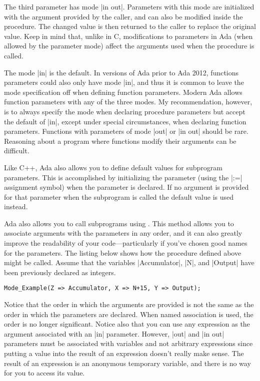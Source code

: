 The third parameter has mode |in out|. Parameters with this mode are initialized with the
argument provided by the caller, and can also be modified inside the procedure. The changed
value is then returned to the caller to replace the original value. Keep in mind that, unlike in
C, modifications to parameters in Ada (when allowed by the parameter mode) affect the arguments
used when the procedure is called.

The mode |in| is the default. In versions of Ada prior to Ada 2012, functions parameters could
also only have mode |in|, and thus it is common to leave the mode specification off when
defining function parameters. Modern Ada allows function parameters with any of the three modes.
My recommendation, however, is to always specify the mode when declaring procedure parameters
but accept the default of |in|, except under special circumstances, when declaring function
parameters. Functions with parameters of mode |out| or |in out| should be rare. Reasoning about
a program where functions modify their arguments can be difficult.

Like C++, Ada also allows you to define default values for subprogram parameters. This is
accomplished by initializing the parameter (using the |:=| assignment symbol) when the parameter
is declared. If no argument is provided for that parameter when the subprogram is called the
default value is used instead.

Ada also allows you to call subprograms using . This
method allows you to associate arguments with the parameters in any order, and it can also
greatly improve the readability of your code---particularly if you've chosen good names for the
parameters. The listing below shows how the procedure defined above might be called. Assume that
the variables |Accumulator|, |N|, and |Output| have been previously declared as integers.

\begin{lstlisting}
Mode_Example(Z => Accumulator, X => N+15, Y => Output);
\end{lstlisting}

\noindent Notice that the order in which the arguments are provided is not the same as the order
in which the parameters are declared. When named association is used, the order is no longer
significant. Notice also that you can use any expression as the argument associated with an |in|
parameter. However, |out| and |in out| parameters must be associated with variables and not
arbitrary expressions since putting a value into the result of an expression doesn't really make
sense. The result of an expression is an anonymous temporary variable, and there is no way for
you to access its value.

